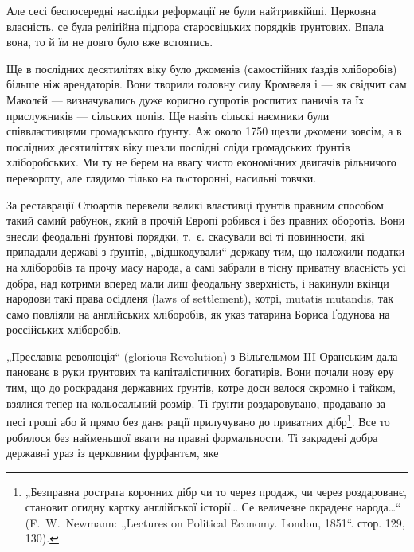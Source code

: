 
Але сесі беспосередні наслідки реформації не були
найтривкійші. Церковна власність, се була реліґійна підпора
старосвіцьких порядків ґрунтових. Впала вона, то й їм не
довго було вже встоятись.

Ще в послідних десятилітях  віку було джоменів
(самостійних ґаздів хліборобів) більше ніж арендаторів.
Вони творили головну силу Кромвеля і — як свідчит сам
Маколєй — визначувались дуже корисно супротів роспитих
паничів та їх прислужників — сільских попів. Ще навіть
сільскі наємники були співвластивцями громадського ґрунту.
Аж около 1750 щезли джомени зовсім, а в послідних десятиліттях
 віку щезли послідні сліди громадських ґрунтів
хліборобських. Ми ту не берем на ввагу чисто економічних
двигачів рільничого перевороту, але глядимо тілько на пoсторонні,
насильні товчки.

За реставрації Стюартів перевели великі властивці
ґрунтів правним способом такий самий рабунок, який в прочій
Европі робився і без правних оборотів. Вони знесли
феодальні ґрунтові порядки, т.~є. скасували всі ті повинности,
які припадали державі з ґрунтів, „відшкодували“ державу
тим, що наложили податки на хліборобів та прочу
масу народа, а самі забрали в тісну приватну власність усі
добра, над котрими вперед мали лиш феодальну зверхність,
і накинули вкінци народови такі права осідленя (laws of
settlement), котрі, mutatis mutandis, так само повліяли на
англійських хліборобів, як указ татарина Бориса Ґодунова
на россійських хліборобів.

„Преславна революція“ (glorious Revolution) з Вільгельмом
III Оранським дала панованє в руки ґрунтових та капіталістичних
богатирів. Вони почали нову еру тим, що до
роскраданя державних ґрунтів, котре доси велося скромно
і тайком, взялися тепер на кольосальний розмір. Ті ґрунти
роздаровувано, продавано за песі гроші або й прямо без
даня рації прилучувано до приватних дібр\footnote{
„Безправна рострата коронних дібр чи то через продаж, чи через
роздарованє, становит огидну картку англійської історії\dots{} Се величезне
окраденє народа\dots{}“ (F.~W.~Newmann: „Lectures on Political Economy.
London, 1851“. стор. 129, 130).
}. Все то робилося
без найменьшої вваги на правні формальности. Ті закрадені
добра державні ураз із церковним фурфантєм, яке
\parbreak{}
